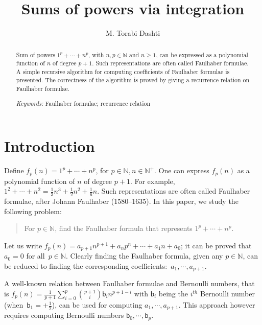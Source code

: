 \documentclass[a4paper,10pt]{amsart}
\theoremstyle{remark}
\newcommand{\nat}{\mathbb{N}}
\begin{document}
\title{{\bf Sums of powers via integration}}

\author{M. Torabi Dashti}
\address{M. Torabi Dashti, Dept. Computer Science, ETH Z{\"u}rich, Switzerland.}



\begin{abstract}
Sum of powers $1^p+\cdots+n^p$, with $n,p\in\nat$ and $n\ge 1$, can be
expressed as a polynomial function of $n$ of degree $p+1$.  Such
representations are often called Faulhaber formulae. A simple
recursive algorithm for computing coefficients of Faulhaber formulae
is presented. The correctness of the algorithm is proved by giving a
recurrence relation on Faulhaber formulae.

\bigskip

\noindent
\emph{Keywords:} Faulhaber formulae; recurrence relation
\end{abstract}

\maketitle

\section{Introduction}
\label{sec:intro}
Define $f_p(n)=1^p+\cdots+n^p$, for $p\in\nat,n\in\nat^+$. One can
express $f_p(n)$ as a polynomial function of $n$ of degree $p+1$. For
example,
$1^2+\cdots+n^2=\frac{1}{3}n^3+\frac{1}{2}n^2+\frac{1}{6}n$. Such
representations are often called Faulhaber formulae, after Johann
Faulhaber (1580--1635). In this paper, we study the following problem:

\vspace{0.5ex}
\begin{quote}
For $p\in\nat$, find the Faulhaber
formula that represents $1^p+\cdots+n^p$.
\end{quote}
\vspace{0.5ex}

Let us write $f_p(n)=a_{p+1} n^{p+1}+a_n p^n+\cdots+a_1 n+a_0$; it can
be proved that $a_0=0$ for all~$p\in\nat$. Clearly finding the
Faulhaber formula, given any $p\in\nat$, can be reduced to finding the
corresponding coefficients:~$a_1,\cdots,a_{p+1}$.


A well-known relation between Faulhaber formulae and Bernoulli
numbers, that is $f_p(n)=\frac{1}{p+1}\sum_{i=0}^p
\binom{p+1}{i}\mathsf{b}_i n^{p+1-i}$ with $\mathsf{b}_i$ being the
$i^\mathit{th}$ Bernoulli number (when~$\mathsf{b}_1=+\frac{1}{2}$),
can be used for computing $a_1,\cdots,a_{p+1}$. This approach however
requires computing Bernoulli numbers $\mathsf{b}_0,
\cdots,\mathsf{b}_p$.
\end{document}

